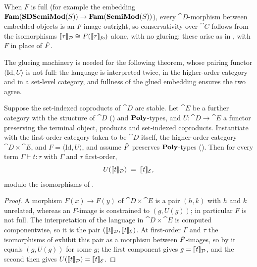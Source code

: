 \begin{remark}
\label{rem:conservativity:full-F}
When $F$ is full (for example the embedding $\mathbf{Fam}(\mathbf{SDSemiMod}(S)) \to \mathbf{Fam}(\mathbf{SemiMod}(S))$), every
$\cat{D}$-morphism between embedded objects is an $F$-image outright, so conservativity over
$\cat{C}$ follows from the isomorphisms $\llbracket \tau \rrbracket_{\mathcal{D}} \cong F(\llbracket \tau \rrbracket_{\mathit{fo}})$
alone, with no glueing; these arise as in , with
$F$ in place of $\hat{F}$.
\end{remark}

The glueing machinery is needed for the following theorem, whose pairing functor
$\langle \mathrm{Id}, U \rangle$ is not full: the language is interpreted twice, in the
higher-order category and in a set-level category, and fullness of the glued embedding ensures
the two agree.

\begin{theorem}
\label{thm:conservativity:underlying}
Suppose the set-indexed coproducts of $\cat{D}$ are stable. Let $\cat{E}$ be a further category with the
structure of $\cat{D}$ () and $\mathbf{Poly}$-types, and $U : \cat{D} \to
\cat{E}$ a functor preserving the terminal object, products and set-indexed coproducts.
Instantiate  with the first-order category taken to be $\cat{D}$
itself, the higher-order category $\cat{D} \times \cat{E}$, and
$F = \langle \mathrm{Id}, U \rangle$, and assume $\hat{F}$ preserves $\mathbf{Poly}$-types
(). Then for every term
$\Gamma \vdash t : \tau$ with $\Gamma$ and $\tau$ first-order,
\[
  U(\llbracket t \rrbracket_{\mathcal{D}}) \;=\; \llbracket t \rrbracket_{\mathcal{E}},
\]
modulo the isomorphisms of .
\end{theorem}

\begin{proof}
A morphism $F(x) \to F(y)$ of $\cat{D} \times \cat{E}$ is a pair $(h, k)$ with $h$ and $k$
unrelated, whereas an $F$-image is constrained to $(g, U(g))$; in particular $F$ is not full. The interpretation of the language in
$\cat{D} \times \cat{E}$ is computed componentwise, so it is the pair $(\llbracket t \rrbracket_{\mathcal{D}},
\llbracket t \rrbracket_{\mathcal{E}})$. At first-order $\Gamma$ and $\tau$ the isomorphisms of
 exhibit this
pair as a morphism between $\hat{F}$-images, so by  it equals
$(g, U(g))$ for some $g$; the first component gives $g = \llbracket t \rrbracket_{\mathcal{D}}$, and the second then
gives $U(\llbracket t \rrbracket_{\mathcal{D}}) = \llbracket t \rrbracket_{\mathcal{E}}$.
\end{proof}

